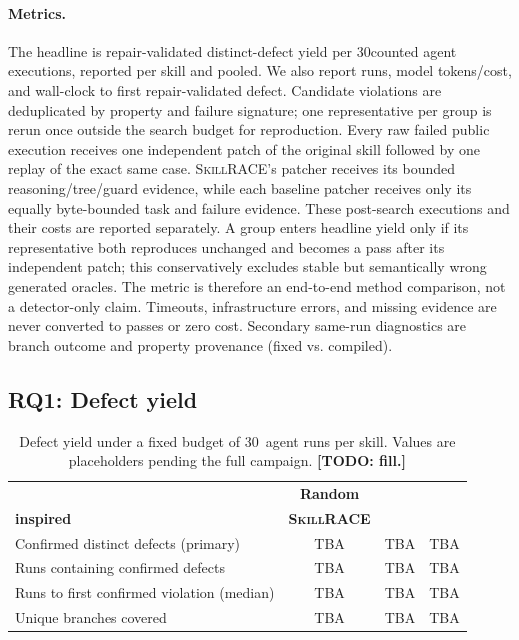 \documentclass[acmsmall,screen,review,anonymous]{acmart}
\newcommand{\todo}[1]{{\color{purple}\textbf{[TODO: #1]}}}
\newcommand{\ph}[1]{{\color{blue}#1}} %
\newcommand{\tool}{\textsc{SkillRACE}\xspace}
\newcommand{\Budget}{30}                     %
\newcommand{\BugsSkillrace}{\ph{TBA}}
\newcommand{\BugsGreybox}{\ph{TBA}}
\newcommand{\BugsRandom}{\ph{TBA}}
\begin{document}
\paragraph{Metrics.} The headline is repair-validated distinct-defect yield per \Budget counted
agent executions, reported per skill and pooled. We also report runs, model tokens/cost,
and wall-clock to first repair-validated defect. Candidate violations are deduplicated by
property and failure signature; one representative per group is rerun once outside the
search budget for reproduction. Every raw failed public execution receives
one independent patch of the original skill followed by one replay of the exact same
case. \tool's patcher receives its bounded reasoning/tree/guard evidence, while each
baseline patcher receives only its equally byte-bounded task and failure evidence. These
post-search executions and their costs are reported separately. A group enters headline
yield only if its representative both reproduces unchanged and becomes a pass after its
independent patch; this conservatively excludes stable but semantically wrong generated
oracles. The metric is therefore an end-to-end method comparison, not a detector-only
claim. Timeouts,
infrastructure errors, and missing
evidence are never converted to passes or zero cost. Secondary same-run diagnostics are
branch outcome and property provenance (fixed vs. compiled).

\subsection{RQ1: Defect yield}
\label{sec:rq1}

\begin{table}[t]
\centering\small
\caption{Defect yield under a fixed budget of \Budget\ agent runs per skill. Values are
placeholders pending the full campaign. \todo{fill.}}
\label{tab:rq1}
\begin{tabular}{@{}l c c c@{}}
\toprule
& \textbf{Random} & \makecell{\textbf{VeriGrey-}\\\textbf{inspired}} & \textbf{\tool}\\
\midrule
Confirmed distinct defects (primary)   & \BugsRandom & \BugsGreybox & \BugsSkillrace\\
Runs containing confirmed defects     & \ph{TBA} & \ph{TBA} & \ph{TBA}\\
Runs to first confirmed violation (median)      & \ph{TBA} & \ph{TBA} & \ph{TBA}\\
Unique branches covered               & \ph{TBA} & \ph{TBA} & \ph{TBA}\\
\bottomrule
\end{tabular}
\end{table}
\end{document}
